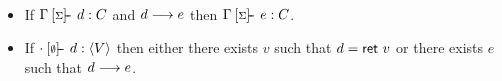 \begin{proposition}
~
\begin{itemize}
\item If $\compgs{d}{C}$ and $d \longrightarrow e$ then $\compgs{e}{C}$.
\item If $\comp{\cdot}{\emptyset}{d}{\rt{V}}$ then either there exists $v$
  such that $d = \mathsf{ret}~v$ or there exists $e$ such that $d \longrightarrow
  e$.
\end{itemize}
\end{proposition}
